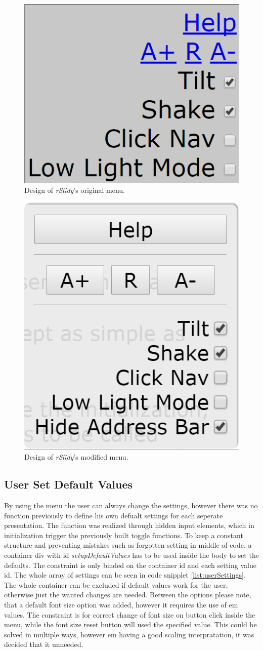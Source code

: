 \begin{figure}[tp]
	\centering
	\includegraphics[width = .4\textwidth]{images/menu_old.png}
	
	\caption[Original Menu]{
		Design of \textit{rSlidy}'s original menu.
	}
	\label{fig:menuOLD}
\end{figure}

\begin{figure}[tp]
	\centering
	\includegraphics[width = .4\textwidth]{images/menu_new.png}
	
	\caption[Modified Menu]{
		Design of \textit{rSlidy}'s modified menu.
	}
	\label{fig:menuNEW}
\end{figure}


\subsection{User Set Default Values} %
\label{sub:user_settings}

By using the menu the user can always change the settings, however there was no function previously to define his own defualt settings for each seperate presentation. The function was realized through hidden input elements, which in initialization trigger the previously built toggle functions. To keep a constant structure and preventing mistakes such as forgotten setting in middle of code, a container div with id \textit{setupDefaultValues} has to be used inside the body to set the defaults. The constraint is only binded on the container id and each setting value id. The whole array of settings can be seen in code snipplet \ref{list:userSettings}. The whole container can be excluded if default values work for the user, otherwise just the wanted changes are needed. Between the options please note, that a default font size option was added, however it requires the use of em values. The constraint is for correct change of font size on button click inside the menu, while the font size reset button will used the specified value. This could be solved in multiple ways, however em having a good scaling interpratation, it was decided that it unneeded.

